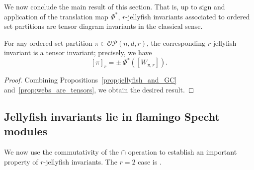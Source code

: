 \documentclass[ALCO, Unicode]{cedram}
\numberwithin{equation}{section}
\newcommand{\ordsetpart}{\mathcal{OP}}
\begin{document}
We now conclude the main result of this section.
That is, up to sign and application of the translation map $\Phi^*$, $r$-jellyfish invariants associated to ordered set partitions are tensor diagram invariants in the classical sense. 
\begin{theorem}
For any ordered set partition $\pi \in \ordsetpart(n,d,r)$, the corresponding $r$-jellyfish invariant is a tensor invariant; precisely, we have \[[\pi]_r = \pm \, \Phi^*([W_{\pi,r}]).\]
\end{theorem}
\begin{proof}
    Combining Propositions~\ref{prop:jellyfish_and_GC} and~\ref{prop:webs_are_tensors}, we obtain the desired result.
\end{proof}

\subsection{Jellyfish invariants lie in flamingo Specht modules}

We now use the commutativity of the $\cap$ operation to establish an important property of $r$-jellyfish invariants. The $r=2$ case is \cite[Lemma~3.14]{Patrias.Pechenik.Striker}.
\end{document}
